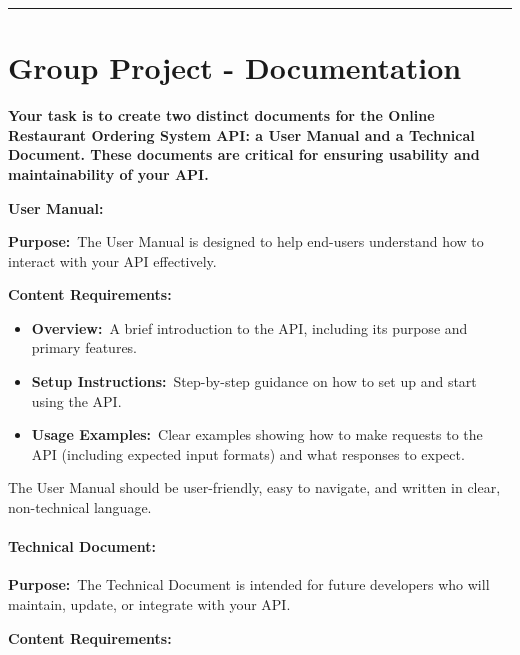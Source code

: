 \documentclass[
]{article}
\providecommand{\tightlist}{%
  \setlength{\itemsep}{0pt}\setlength{\parskip}{0pt}}
\begin{document}
\begin{center}\rule{0.5\linewidth}{0.5pt}\end{center}

\section{Group Project -
Documentation}\label{group-project---documentation}

\textbf{Your task is to create two distinct documents for the Online
Restaurant Ordering System API: a User Manual and a Technical Document.
These documents are critical for ensuring usability and maintainability
of your API.}

\textbf{User Manual:}

\textbf{Purpose:}~The User Manual is designed to help end-users
understand how to interact with your API effectively.

\textbf{Content Requirements:}

\begin{itemize}
\tightlist
\item
  \textbf{Overview:}~A brief introduction to the API, including its
  purpose and primary features.
\item
  \textbf{Setup Instructions:}~Step-by-step guidance on how to set up
  and start using the API.
\item
  \textbf{Usage Examples:}~Clear examples showing how to make requests
  to the API (including expected input formats) and what responses to
  expect.
\end{itemize}

The User Manual should be user-friendly, easy to navigate, and written
in clear, non-technical language.

\paragraph{\texorpdfstring{\textbf{Technical
Document:}}{Technical Document:}}\label{technical-document}

\textbf{Purpose:}~The Technical Document is intended for future
developers who will maintain, update, or integrate with your API.

\textbf{Content Requirements:}
\end{document}
